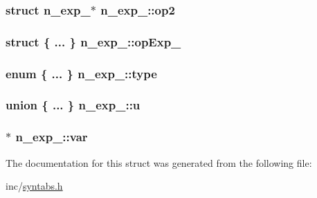 \subsubsection[{\texorpdfstring{op2}{op2}}]{\setlength{\rightskip}{0pt plus 5cm}struct {\bf n\+\_\+exp\+\_\+}$\ast$ n\+\_\+exp\+\_\+\+::op2}\hypertarget{structn__exp___af1d5707ba3f56f28de64916ec6883d06}{}\label{structn__exp___af1d5707ba3f56f28de64916ec6883d06}
\subsubsection[{\texorpdfstring{op\+Exp\+\_\+}{opExp_}}]{\setlength{\rightskip}{0pt plus 5cm}struct \{ ... \}   n\+\_\+exp\+\_\+\+::op\+Exp\+\_\+}\hypertarget{structn__exp___adcf66bf19213c70f9fa7f7b492a003de}{}\label{structn__exp___adcf66bf19213c70f9fa7f7b492a003de}
\subsubsection[{\texorpdfstring{type}{type}}]{\setlength{\rightskip}{0pt plus 5cm}enum \{ ... \}   n\+\_\+exp\+\_\+\+::type}\hypertarget{structn__exp___a885a8dfa3936b9f7161a86c710b0295d}{}\label{structn__exp___a885a8dfa3936b9f7161a86c710b0295d}
\subsubsection[{\texorpdfstring{u}{u}}]{\setlength{\rightskip}{0pt plus 5cm}union \{ ... \}  n\+\_\+exp\+\_\+\+::u}\hypertarget{structn__exp___a8c4088fb555e77092073185e713cb224}{}\label{structn__exp___a8c4088fb555e77092073185e713cb224}
\subsubsection[{\texorpdfstring{var}{var}}]{$\ast$ n\+\_\+exp\+\_\+\+::var}\hypertarget{structn__exp___ac87b093b17ae6635f33ca65b7343e9fe}{}\label{structn__exp___ac87b093b17ae6635f33ca65b7343e9fe}


The documentation for this struct was generated from the following file\+:\begin{DoxyCompactItemize}
\item 
inc/\hyperlink{syntabs_8h}{syntabs.\+h}\end{DoxyCompactItemize}
